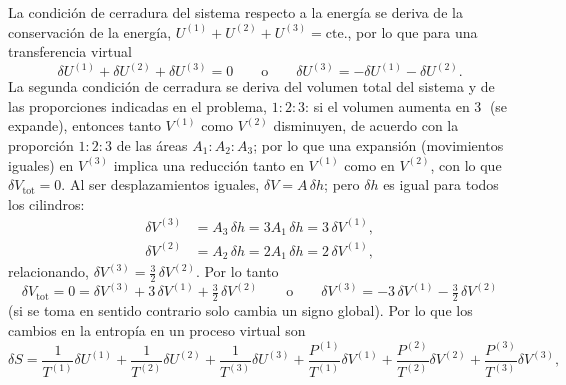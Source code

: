 \begin{solucion}
  La condición de cerradura del sistema respecto a la energía se deriva de la conservación de la
  energía, $U^{(1)}+U^{(2)}+U^{(3)}=\text{cte.}$, por lo que para una transferencia virtual
  \begin{equation*}
    \delta U^{(1)}+\delta U^{(2)}+\delta U^{(3)}=0
    \qquad\text{o}\qquad
    \delta U^{(3)}=-\delta U^{(1)}-\delta U^{(2)}.
  \end{equation*}
  La segunda condición de cerradura se deriva del volumen total del sistema y de las proporciones
  indicadas en el problema, $1:2:3$: si el volumen aumenta en \textcircled{3} (se expande), entonces
  tanto $V^{(1)}$ como $V^{(2)}$ disminuyen, de acuerdo con la proporción $1:2:3$ de las áreas
  $A_1:A_2:A_3$; por lo que una expansión (movimientos iguales) en $V^{(3)}$ implica una reducción
  tanto en $V^{(1)}$ como en $V^{(2)}$, con lo que $\delta V_{\mathrm{tot}}=0$. Al ser
  desplazamientos iguales, $\delta V=A\,\delta h$; pero $\delta h$ es igual para todos los cilindros:
  \begin{align*}
    \delta V^{(3)}&=A_3\,\delta h=3A_1\,\delta h=3\,\delta V^{(1)},\\
    \delta V^{(2)}&=A_2\,\delta h=2A_1\,\delta h=2\,\delta V^{(1)},
  \end{align*}
  relacionando, $\delta V^{(3)}=\frac{3}{2}\,\delta V^{(2)}$. Por lo tanto
  \begin{equation*}
    \delta V_{\mathrm{tot}}=0=\delta V^{(3)}+3\,\delta V^{(1)}+\tfrac{3}{2}\,\delta V^{(2)}
    \qquad\text{o}\qquad
    \delta V^{(3)}=-3\,\delta V^{(1)}-\tfrac{3}{2}\,\delta V^{(2)}
  \end{equation*}
  (si se toma en sentido contrario solo cambia un signo global).
  Por lo que los cambios en la entropía en un proceso virtual son
  \begin{equation*}
    \delta S=\frac{1}{T^{(1)}}\delta U^{(1)}+\frac{1}{T^{(2)}}\delta U^{(2)}+\frac{1}{T^{(3)}}\delta U^{(3)}
      +\frac{P^{(1)}}{T^{(1)}}\delta V^{(1)}+\frac{P^{(2)}}{T^{(2)}}\delta V^{(2)}+\frac{P^{(3)}}{T^{(3)}}\delta V^{(3)},
  \end{equation*}

\end{solucion}
